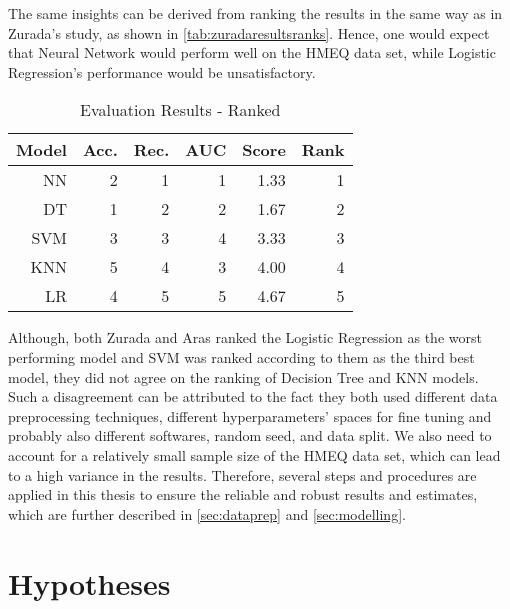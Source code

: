 The same insights can be derived from ranking the results in the same way as in Zurada's study, as shown in \autoref{tab:zuradaresultsranks}.
Hence, one would expect that Neural Network would perform well on the HMEQ data set, while Logistic Regression's performance would be unsatisfactory.
\begin{table}[H]
    \small
    \setlength{\tabcolsep}{8pt}
    \renewcommand{\arraystretch}{1.3}
    \centering
    \caption[Evaluation Results - Ranked \citep{zurada2014classification}]{Evaluation Results - Ranked \citep{zurada2014classification}}\label{tab:zuradaresultsranks}
    \begin{tabular}{r r r r r r}
    \toprule
    \textbf{Model} & \textbf{Acc.} & \textbf{Rec.} & \textbf{AUC} & \textbf{Score} & \textbf{Rank} \\
    \midrule
    \hline
    NN & 2 & 1 & 1 & 1.33 & 1 \\ 
    DT & 1 & 2 & 2 & 1.67 & 2 \\ 
    SVM & 3 & 3 & 4 & 3.33 & 3 \\ 
    KNN & 5 & 4 & 3 & 4.00 & 4 \\ 
    LR & 4 & 5 & 5 & 4.67 & 5 \\ 
    \hline
    \bottomrule
    \end{tabular}
    \vspace{0.35em}
    
    \vspace{-1em}
\end{table}

Although, both Zurada and Aras ranked the Logistic Regression as the worst performing model and SVM was ranked according to them as the third best model, they did not agree on the ranking of Decision Tree and KNN models.
Such a disagreement can be attributed to the fact they both used different data preprocessing techniques, different hyperparameters' spaces for fine tuning and probably also different softwares, random seed, and data split.
We also need to account for a relatively small sample size of the HMEQ data set, which can lead to a high variance in the results.
Therefore, several steps and procedures are applied in this thesis to ensure the reliable and robust results and estimates, which are further described in \autoref{sec:dataprep} and \autoref{sec:modelling}.

\section{Hypotheses}
\label{sec:hypo}

